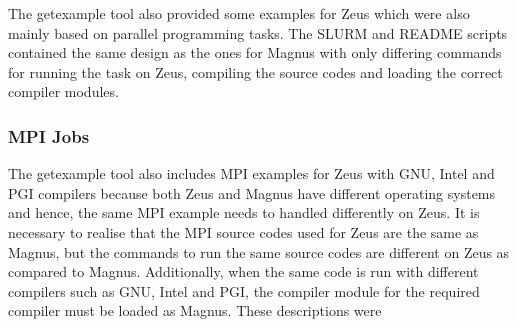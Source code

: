 \documentclass[journal]{IEEEtran}
\begin{document}
The getexample tool also provided some examples for Zeus which were also mainly based on parallel programming tasks. The SLURM and README scripts
contained the same design as the ones for Magnus with only differing commands for running the task on Zeus, compiling the source codes and loading the
correct compiler modules. 
 
\subsubsection{MPI Jobs}

The getexample tool also includes MPI examples for Zeus with GNU, Intel and PGI compilers because both Zeus and Magnus have different operating systems 
and hence, the same MPI example needs to handled differently on Zeus. It is necessary to realise that the MPI source codes used for Zeus are the same
as Magnus, but the commands to run the same source codes are different on Zeus as compared to Magnus. Additionally, when the same code is run 
with different compilers such as GNU, Intel and PGI, the compiler module for the required compiler must be loaded as Magnus. These descriptions were
\end{document}
